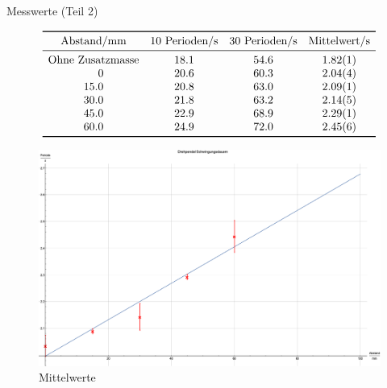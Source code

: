 \documentclass[11pt,a4paper]{article}
\begin{document}
\begin{table}[h]
\caption{Messwerte (Teil 2)}
$$
\begin{array}{cccc}	
	\toprule 
	\textrm{Abstand/mm} & \textrm{10 Perioden/s} & \textrm{30 Perioden/s} & \textrm{Mittelwert/s}\\ 
	\midrule
	\multicolumn{1}{l}{\textrm{Ohne Zusatzmasse}} & 18.1 & 54.6 & 1.82(1)\\
	\phantom{zz.}0 & 20.6 & 60.3 & 2.04(4)\\
	15.0 & 20.8 & 63.0 & 2.09(1)\\
	30.0 & 21.8 & 63.2 & 2.14(5)\\
	45.0 & 22.9 & 68.9 & 2.29(1)\\
	60.0 & 24.9 & 72.0 & 2.45(6)\\
	\bottomrule 
\end{array}
$$
\end{table}

\begin{figure}[h]
\centering
\includegraphics[width=1\textwidth]{trick17}
\renewcommand\thefigure{B3}
\caption{Mittelwerte}
\label{t17}
\end{figure}
\end{document}
